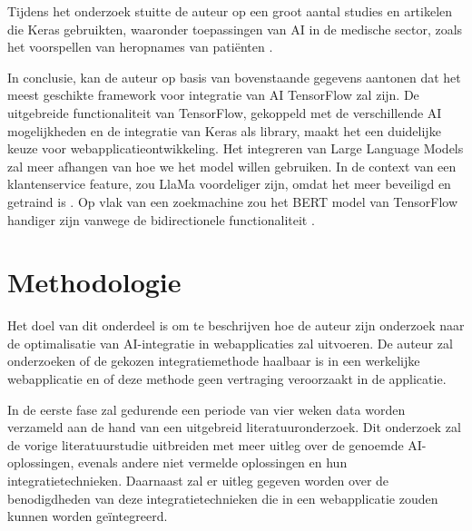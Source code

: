 \documentclass[dutch]{hogent-article}
\begin{document}
Tijdens het onderzoek stuitte de auteur op een groot aantal studies en artikelen die Keras gebruikten, waaronder toepassingen van AI in de medische sector, zoals het voorspellen van heropnames van patiënten \autocite{Anshik2021}.

In conclusie, kan de auteur op basis van bovenstaande gegevens aantonen dat het meest geschikte framework voor integratie van AI TensorFlow zal zijn. De uitgebreide functionaliteit van TensorFlow, gekoppeld met de verschillende AI mogelijkheden en de integratie van Keras als library, maakt het een duidelijke keuze voor webapplicatieontwikkeling. Het integreren van Large Language Models zal meer afhangen van hoe we het model willen gebruiken. In de context van een klantenservice feature, zou LlaMa voordeliger zijn, omdat het meer beveiligd en getraind is \autocite{Touvron2023Llama2O}. Op vlak van een zoekmachine zou het BERT model van TensorFlow handiger zijn vanwege de bidirectionele functionaliteit \autocite{Devlin2018}.

\section{Methodologie}%
\label{sec:methodology}


Het doel van dit onderdeel is om te beschrijven hoe de auteur zijn onderzoek naar de optimalisatie van AI-integratie in webapplicaties zal uitvoeren. De auteur zal onderzoeken of de gekozen integratiemethode haalbaar is in een werkelijke webapplicatie en of deze methode geen vertraging veroorzaakt in de applicatie.

In de eerste fase zal gedurende een periode van vier weken data worden verzameld aan de hand van een uitgebreid literatuuronderzoek. Dit onderzoek zal de vorige literatuurstudie uitbreiden met meer uitleg over de genoemde AI-oplos\-singen, evenals andere niet vermelde oplossingen en hun integratietechnieken. Daarnaast zal er uitleg gegeven worden over de benodigdheden van deze integratietechnieken die in een webapplicatie zouden kunnen worden geïntegreerd.
\end{document}
